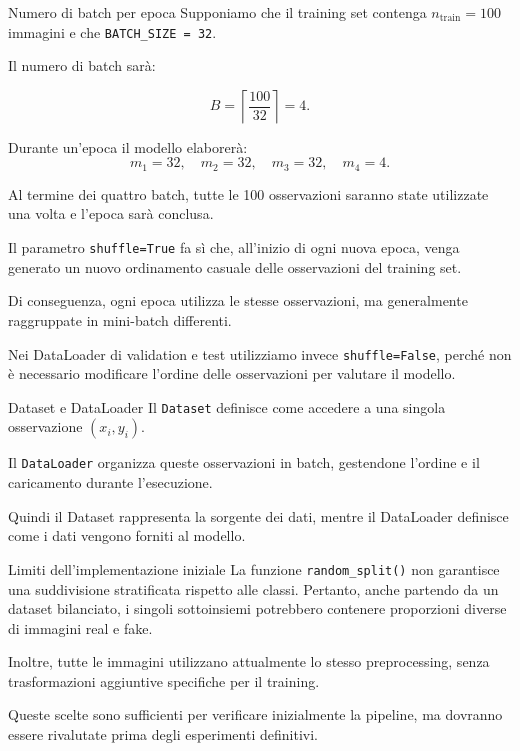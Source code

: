\documentclass[10pt,a4paper,oneside]{book}
\begin{document}
\begin{examplebox}{Numero di batch per epoca}
Supponiamo che il training set contenga
$n_{\mathrm{train}}=100$ immagini e che
\texttt{BATCH\_SIZE = 32}.

Il numero di batch sarà:

\[
B = \left\lceil \frac{100}{32} \right\rceil = 4.
\]

Durante un'epoca il modello elaborerà:
\[
m_1=32,\quad m_2=32,\quad m_3=32,\quad m_4=4.
\]

Al termine dei quattro batch, tutte le 100 osservazioni
saranno state utilizzate una volta e l'epoca sarà conclusa.
\end{examplebox}

Il parametro \texttt{shuffle=True} fa sì che, all'inizio
di ogni nuova epoca, venga generato un nuovo ordinamento
casuale delle osservazioni del training set.

Di conseguenza, ogni epoca utilizza le stesse osservazioni,
ma generalmente raggruppate in mini-batch differenti.

Nei DataLoader di validation e test utilizziamo invece
\texttt{shuffle=False}, perché non è necessario modificare
l'ordine delle osservazioni per valutare il modello.

\begin{importantbox}{Dataset e DataLoader}
Il \texttt{Dataset} definisce come accedere a una singola
osservazione $(x_i,y_i)$.

Il \texttt{DataLoader} organizza queste osservazioni in batch,
gestendone l'ordine e il caricamento durante l'esecuzione.

Quindi il Dataset rappresenta la sorgente dei dati, mentre
il DataLoader definisce come i dati vengono forniti al modello.
\end{importantbox}

\begin{warningbox}{Limiti dell'implementazione iniziale}
La funzione \texttt{random\_split()} non garantisce una
suddivisione stratificata rispetto alle classi. Pertanto,
anche partendo da un dataset bilanciato, i singoli sottoinsiemi
potrebbero contenere proporzioni diverse di immagini real e fake.

Inoltre, tutte le immagini utilizzano attualmente lo stesso
preprocessing, senza trasformazioni aggiuntive specifiche per
il training.

Queste scelte sono sufficienti per verificare inizialmente
la pipeline, ma dovranno essere rivalutate prima degli
esperimenti definitivi.
\end{warningbox}
\end{document}

